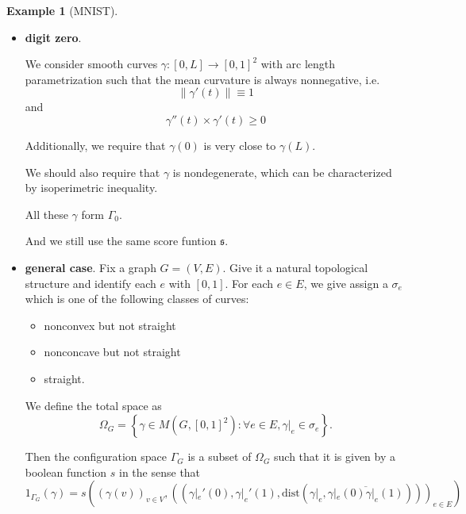 \documentclass[11pt]{article} 	%
\theoremstyle{definition}
\newtheorem*{example}{Example}
\begin{document}
\begin{example}[MNIST]
\begin{itemize}
[an image here]

Here we consider all continuous $\gamma:[0,2]\to [0,1]^2$ such that $\gamma|_{[0,1]}, \gamma|_{[1,2]}$ are straight line segments. Additionally, there should be some constraint on the positions of $\gamma(0), \gamma(1), \gamma(2)$ such that $\overline{\gamma(0)\gamma(1)}$ is very close to being horizontal, and $\overline{\gamma(1)\gamma(2)}$ should be roughly vertical downward.

The score function $\mathfrak{s}$ is the same.

The dimensionality of the configuration space is 6, which can actually be reduced to 5.

\item \textbf{digit zero}.

We consider smooth curves $\gamma:[0,L]\to [0,1]^2$ with arc length parametrization such that the mean curvature is always nonnegative, i.e.
\begin{equation}
	\|\gamma'(t)\|\equiv 1
\end{equation}
and
\begin{equation}
	\gamma''(t)\times \gamma'(t) \ge 0
\end{equation}

Additionally, we require that $\gamma(0)$ is very close to $\gamma(L)$.

We should also require that $\gamma$ is nondegenerate, which can be characterized by isoperimetric inequality.

All these $\gamma$ form $\Gamma_0$.

And we still use the same score funtion $\mathfrak{s}$.

\item \textbf{general case}. Fix a graph $G=(V,E)$. Give it a natural topological structure and identify each $e$ with $[0,1]$. For each $e\in E$, we give assign a $\sigma_e$ which is one of the following classes of curves:

\begin{itemize}
	\item nonconvex but not straight
	\item nonconcave but not straight
	\item straight.
\end{itemize}

We define the total space as
\begin{equation}
	\Omega_G = \left\{\gamma\in M(G, [0,1]^2): \forall e\in E, \gamma|_e\in \sigma_e\right\}.
\end{equation}

Then the configuration space $\Gamma_G$ is a subset of $\Omega_G$ such that it is given by a boolean function $s$ in the sense that
\begin{equation}
	1_{\Gamma_G}(\gamma)=s((\gamma(v))_{v\in V},((\gamma|_e'(0), \gamma|_e'(1), \text{dist}(\gamma|_e,\overline{\gamma|_e(0)\gamma|_e(1)})))_{e\in E})
\end{equation}
\end{itemize}
\end{example}
\end{document}

